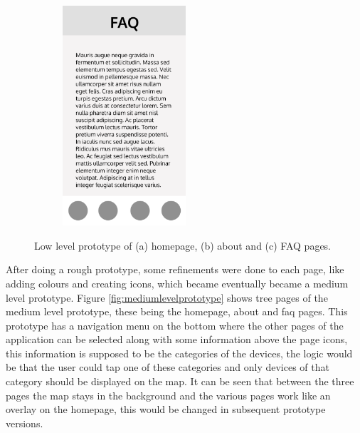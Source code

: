 \begin{figure}
\begin{subfigure}{0.33\textwidth}
    \end{subfigure}%
    \begin{subfigure}{0.33\textwidth}
        \centering
        \includegraphics[width=130pt]{../assets/images/low_more_info.png}
        \caption{}
        \label{fig:lowfaq}
    \end{subfigure}%
    \caption{Low level prototype of (a) homepage, (b) about and (c) FAQ pages.}
    \label{fig:lowlevelprototype}
\end{figure}

After doing a rough prototype, some refinements were done to each page, like
adding colours and creating icons, which became eventually became a medium level
prototype. Figure \ref{fig:mediumlevelprototype} shows tree pages of the medium level
prototype, these being the homepage, about
and faq pages. This prototype has a navigation menu on the bottom where the
other pages of the application can be selected along with some information
above the page icons, this information is supposed to be the categories of
the devices, the logic would be that the user could tap one of these categories
and only devices of that category should be displayed on the map. It can
be seen that between the three pages the map stays in the background and
the various pages work like an overlay on the homepage, this would be
changed in subsequent prototype versions.

